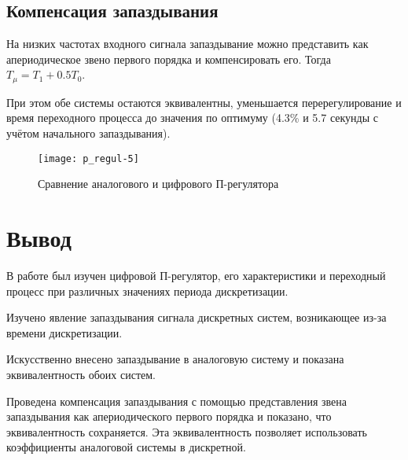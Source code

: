     \subsection{Компенсация запаздывания}
    На низких частотах входного сигнала запаздывание можно представить как апериодическое звено первого порядка и
    компенсировать его. Тогда $T_\mu = T_1 + 0.5T_0$.

    При этом обе системы остаются эквивалентны, уменьшается перерегулирование и время переходного процесса до значения
    по оптимуму (4.3\% и 5.7 секунды с учётом начального запаздывания).
    \begin{figure}[H]
        \centering\texttt{[image: p\_regul-5]}
        \caption{Сравнение аналогового и цифрового П-регулятора}
    \end{figure}


    \section{Вывод}
    В работе был изучен цифровой П-регулятор, его характеристики и переходный процесс при различных значениях периода дискретизации.
    
    Изучено явление запаздывания сигнала дискретных систем, возникающее из-за времени дискретизации.
     
    Искусственно внесено запаздывание в аналоговую систему и показана эквивалентность обоих систем.
     
    Проведена компенсация запаздывания с помощью представления звена запаздывания как
    апериодического первого порядка и показано, что эквивалентность сохраняется.
    Эта эквивалентность позволяет использовать коэффициенты аналоговой системы в дискретной.

